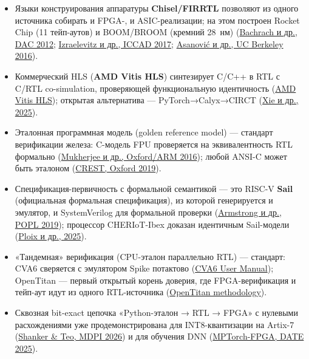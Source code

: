 \documentclass[
  russian,
]{article}
\providecommand{\tightlist}{%
  \setlength{\itemsep}{0pt}\setlength{\parskip}{0pt}}
\begin{document}
\begin{itemize}
\tightlist
\item
  Языки конструирования аппаратуры \textbf{Chisel/FIRRTL} позволяют из
  одного источника собирать и FPGA-, и ASIC-реализации; на этом построен
  Rocket Chip (11 тейп-аутов) и BOOM/BROOM (кремний 28~нм)
  (\href{https://dl.acm.org/doi/10.1145/2228360.2228584}{Bachrach и др.,
  DAC 2012};
  \href{http://ieeexplore.ieee.org/document/8203780/}{Izraelevitz и др.,
  ICCAD 2017};
  \href{https://www2.eecs.berkeley.edu/Pubs/TechRpts/2016/EECS-2016-17.html}{Asanović
  и др., UC Berkeley 2016}).
\item
  Коммерческий HLS (\textbf{AMD Vitis HLS}) синтезирует C/C++ в RTL с
  C/RTL co-simulation, проверяющей функциональную идентичность
  (\href{https://www.amd.com/en/products/software/adaptive-socs-and-fpgas/vitis/vitis-hls.html}{AMD
  Vitis HLS}); открытая альтернатива --- PyTorch→Calyx→CIRCT
  (\href{https://arxiv.org/abs/2512.06177}{Xie и др., 2025}).
\item
  Эталонная программная модель (golden reference model) --- стандарт
  верификации железа: C-модель FPU проверяется на эквивалентность RTL
  формально (\href{https://arxiv.org/abs/1609.00169}{Mukherjee и др.,
  Oxford/ARM 2016}); любой ANSI-C может быть эталоном
  (\href{https://arxiv.org/abs/1908.01324}{CREST, Oxford 2019}).
\item
  Спецификация-первичность с формальной семантикой --- это RISC-V
  \textbf{Sail} (официальная формальная спецификация), из которой
  генерируется и эмулятор, и SystemVerilog для формальной проверки
  (\href{https://dl.acm.org/doi/10.1145/3290384}{Armstrong и др., POPL
  2019}); процессор CHERIoT-Ibex доказан идентичным Sail-модели
  (\href{https://arxiv.org/abs/2502.04738}{Ploix и др., 2025}).
\item
  «Тандемная» верификация (CPU-эталон параллельно RTL) --- стандарт:
  CVA6 сверяется с эмулятором Spike потактово
  (\href{https://docs.openhwgroup.org/projects/cva6-user-manual/}{CVA6
  User Manual}); OpenTitan --- первый открытый корень доверия, где
  FPGA-верификация и тейп-аут идут из одного RTL-источника
  (\href{https://opentitan.org/book/doc/contributing/hw/methodology.html}{OpenTitan
  methodology}).
\item
  Сквозная bit-exact цепочка «Python-эталон → RTL → FPGA» с нулевыми
  расхождениями уже продемонстрирована для INT8-квантизации на Artix-7
  (\href{https://www.mdpi.com/2079-9292/15/5/1117}{Shanker \& Teo, MDPI
  2026}) и для обучения DNN
  (\href{https://ieeexplore.ieee.org/document/10993010/}{MPTorch-FPGA,
  DATE 2025}).
\end{itemize}
\end{document}
